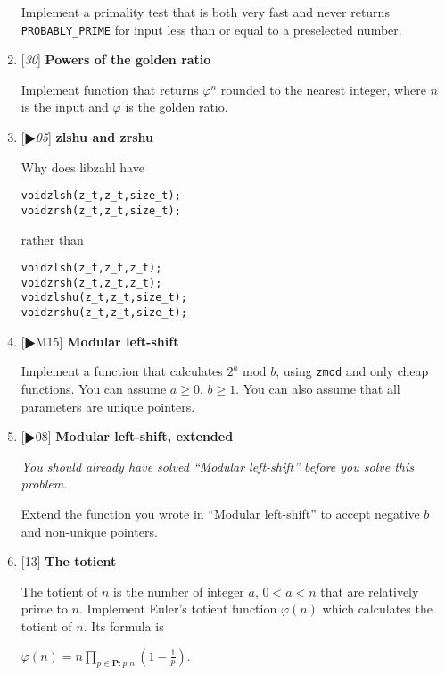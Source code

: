 \begin{enumerate}[label=\textbf{\arabic*}.]
Implement a primality test that is both very fast and
never returns \texttt{PROBABLY\_PRIME} for input less
than or equal to a preselected number.



\item {[\textit{30}]} \textbf{Powers of the golden ratio}

Implement function that returns $\varphi^n$ rounded
to the nearest integer, where $n$ is the input and
$\varphi$ is the golden ratio.



\item {[\textit{$\RHD$05}]} \textbf{zlshu and zrshu}

Why does libzahl have

\vspace{-1em}
\begin{alltt}
   void zlsh(z_t, z_t, size_t);
   void zrsh(z_t, z_t, size_t);
\end{alltt}
\vspace{-1em}

\noindent
rather than

\vspace{-1em}
\begin{alltt}
   void zlsh(z_t, z_t, z_t);
   void zrsh(z_t, z_t, z_t);
   void zlshu(z_t, z_t, size_t);
   void zrshu(z_t, z_t, size_t);
\end{alltt}
\vspace{-1em}



\item {[$\RHD$M15]} \textbf{Modular left-shift}

Implement a function that calculates
$2^a \text{ mod } b$, using \texttt{zmod} and
only cheap functions. You can assume $a \ge 0$,
 $b \ge 1$. You can also assume that all
parameters are unique pointers.



\item {[$\RHD$08]} \textbf{Modular left-shift, extended}

{\small\textit{You should already have solved
``Modular left-shift'' before you solve this
problem.}}

Extend the function you wrote in ``Modular left-shift''
to accept negative $b$ and non-unique pointers.



\item {[13]} \textbf{The totient}

The totient of $n$ is the number of integer $a$,
$0 < a < n$ that are relatively prime to $n$.
Implement Euler's totient function $\varphi(n)$
which calculates the totient of $n$. Its
formula is

\( \displaystyle{
    \varphi(n) = n \prod_{p \in \textbf{P} : p | n}
    \left ( 1 - \frac{1}{p} \right ).
}\)



\end{enumerate}



